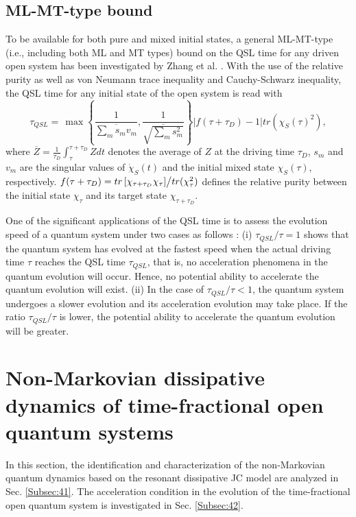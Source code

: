 \documentclass[
showpacs,  %
showkeys,  %
aps,       %
amsthm,    %
amsmath,   %
amsfonts,  %
amssymb    %
]{revtex4-1}          %
\begin{document}
\subsection{ML-MT-type bound}
\label{Subsec:32}
To be available for both pure and mixed initial states, a general ML-MT-type (i.e., including both ML and MT types) bound on the QSL time for any driven open system has been investigated by Zhang et al. \cite{ZhangYJ2014}. With the use of the relative purity as well as von Neumann trace inequality and Cauchy-Schwarz inequality, the QSL time for any initial state of the open system is read with
\begin{equation}
\label{e16}
{\tau _{QSL}} = \,\max \left\{ {\frac{1}{{\overline {\sum\limits_m {{s_m}{v_m}} } }},\frac{1}{{\overline {\sqrt {\sum\limits_m {s_m^2} } } }}} \right\}\left| {f(\tau  + {\tau _D}) - 1} \right|tr({\chi _S}{(\tau )^2}),
\end{equation}
where $\overline Z  = \frac{1}{{{\tau _D}}}\int_\tau ^{\tau  + {\tau _D}} {Zdt}$ denotes the average of $Z$ at the driving time $\tau _D$, ${{s_m}}$ and ${{v_m}}$ are the singular values of ${{\dot \chi }_S}(t)$ and the initial mixed state ${\chi _S}(\tau )$, respectively. $f(\tau  + {\tau _D}) = {{tr\left[ {{\chi _{\tau  + {\tau _D}}}{\chi _\tau }} \right]} \mathord{\left/{\vphantom {{tr\left[ {{\chi _{\tau  + {\tau _D}}}{\chi _\tau }} \right]} {tr(\chi _\tau ^2)}}} \right.\kern-\nulldelimiterspace} {tr(\chi _\tau ^2)}}$ defines the relative purity between the initial state $\chi_\tau$ and its target state $\chi_{\tau+{\tau _D}}$.

One of the significant applications of the QSL time is to assess the evolution speed of a quantum system under two cases as follows \cite{Liuchen2015}: (i) ${\tau _{QSL}}/{\tau}=1$ shows that the quantum system has evolved at the fastest speed when the actual driving time $\tau$ reaches the QSL time $\tau_{QSL}$, that is, no acceleration phenomena in the quantum evolution will occur. Hence, no potential ability to accelerate the quantum evolution will exist. (ii) In the case of ${\tau _{QSL}}/{\tau}<1$, the quantum system undergoes a slower evolution and its acceleration evolution may take place. If the ratio ${\tau _{QSL}}/{\tau}$ is lower, the potential ability to accelerate the quantum evolution will be greater.



\section{Non-Markovian dissipative dynamics of time-fractional open quantum systems}
\label{Sec:4}
In this section, the identification and characterization of the non-Markovian quantum dynamics based on the resonant dissipative JC model are analyzed in Sec. \ref{Subsec:41}. The acceleration condition in the evolution of the time-fractional open quantum system is investigated in Sec. \ref{Subsec:42}.
\end{document}
